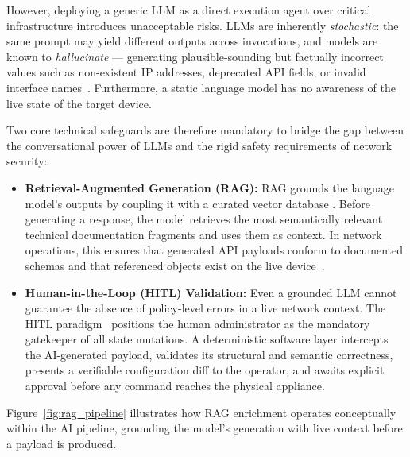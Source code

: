 However, deploying a generic LLM as a direct execution agent over critical infrastructure introduces unacceptable risks. LLMs are inherently \emph{stochastic}: the same prompt may yield different outputs across invocations, and models are known to \emph{hallucinate} — generating plausible-sounding but factually incorrect values such as non-existent IP addresses, deprecated API fields, or invalid interface names~\cite{wang2024netconfeval}. Furthermore, a static language model has no awareness of the live state of the target device.

Two core technical safeguards are therefore mandatory to bridge the gap between the conversational power of LLMs and the rigid safety requirements of network security:

\begin{itemize}
    \item \textbf{Retrieval-Augmented Generation (RAG):} RAG grounds the language model's outputs by coupling it with a curated vector database \cite{lewis2020rag}. Before generating a response, the model retrieves the most semantically relevant technical documentation fragments and uses them as context. In network operations, this ensures that generated API payloads conform to documented schemas and that referenced objects exist on the live device~\cite{shajarian2024rag}.

    \item \textbf{Human-in-the-Loop (HITL) Validation:} Even a grounded LLM cannot guarantee the absence of policy-level errors in a live network context. The HITL paradigm~\cite{gomez2024hitl} positions the human administrator as the mandatory gatekeeper of all state mutations. A deterministic software layer intercepts the AI-generated payload, validates its structural and semantic correctness, presents a verifiable configuration diff to the operator, and awaits explicit approval before any command reaches the physical appliance.
\end{itemize}

Figure~\ref{fig:rag_pipeline} illustrates how RAG enrichment operates conceptually within the AI pipeline, grounding the model's generation with live context before a payload is produced.

